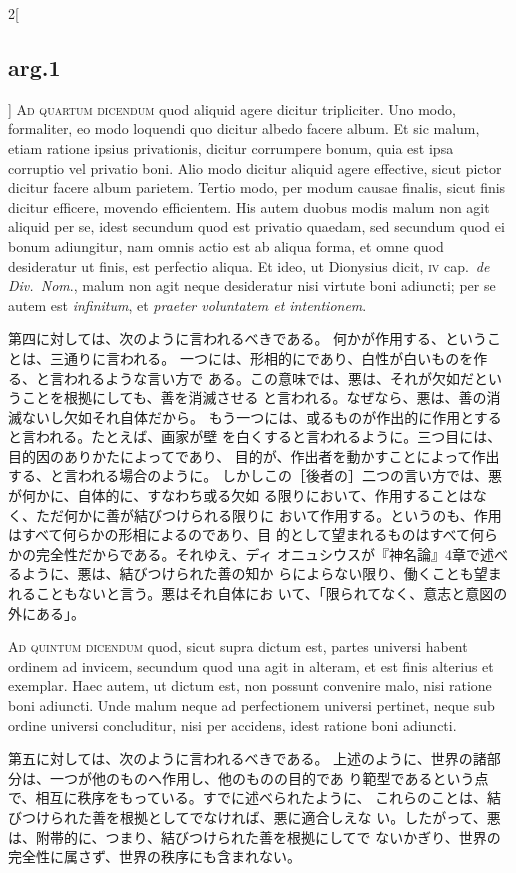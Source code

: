 \documentclass[paper=a4paper,fontsize=10pt,jafontsize=9pt,titlepage]{jlreq}
\begin{document}
\begin{paracol}{2}[\subsection{arg.1}]
{\scshape Ad quartum dicendum} quod aliquid agere dicitur
 tripliciter. Uno modo, formaliter, eo modo loquendi quo dicitur albedo
 facere album. Et sic malum, etiam ratione ipsius privationis, dicitur
 corrumpere bonum, quia est ipsa corruptio vel privatio boni. Alio modo
 dicitur aliquid agere effective, sicut pictor dicitur facere album
 parietem. Tertio modo, per modum causae finalis, sicut finis dicitur
 efficere, movendo efficientem. His autem duobus modis malum non agit
 aliquid per se, idest secundum quod est privatio quaedam, sed secundum
 quod ei bonum adiungitur, nam omnis actio est ab aliqua forma, et omne
 quod desideratur ut finis, est perfectio aliqua. Et ideo, ut Dionysius
 dicit, {\scshape iv} cap.~{\itshape de Div.~Nom}., malum non agit neque
 desideratur nisi virtute boni adiuncti; per se autem est {\itshape
 infinitum}, et {\itshape praeter voluntatem et intentionem}.

\switchcolumn

第四に対しては、次のように言われるべきである。
何かが作用する、ということは、三通りに言われる。
一つには、形相的にであり、白性が白いものを作る、と言われるような言い方で
 ある。この意味では、悪は、それが欠如だということを根拠にしても、善を消滅させる
 と言われる。なぜなら、悪は、善の消滅ないし欠如それ自体だから。
もう一つには、或るものが作出的に作用とすると言われる。たとえば、画家が壁
 を白くすると言われるように。三つ目には、目的因のありかたによってであり、
 目的が、作出者を動かすことによって作出する、と言われる場合のように。
しかしこの［後者の］二つの言い方では、悪が何かに、自体的に、すなわち或る欠如
 る限りにおいて、作用することはなく、ただ何かに善が結びつけられる限りに
 おいて作用する。というのも、作用はすべて何らかの形相によるのであり、目
 的として望まれるものはすべて何らかの完全性だからである。それゆえ、ディ
 オニュシウスが『神名論』4章で述べるように、悪は、結びつけられた善の知か
 らによらない限り、働くことも望まれることもないと言う。悪はそれ自体にお
 いて、「限られてなく、意志と意図の外にある」。

\switchcolumn*[\subsection{ad.5}]

{\scshape Ad quintum dicendum} quod, sicut supra dictum est, partes
 universi habent ordinem ad invicem, secundum quod una agit in alteram,
 et est finis alterius et exemplar. Haec autem, ut dictum est, non
 possunt convenire malo, nisi ratione boni adiuncti. Unde malum neque ad
 perfectionem universi pertinet, neque sub ordine universi concluditur,
 nisi per accidens, idest ratione boni adiuncti.

\switchcolumn

第五に対しては、次のように言われるべきである。
上述のように、世界の諸部分は、一つが他のものへ作用し、他のものの目的であ
 り範型であるという点で、相互に秩序をもっている。すでに述べられたように、
 これらのことは、結びつけられた善を根拠としてでなければ、悪に適合しえな
 い。したがって、悪は、附帯的に、つまり、結びつけられた善を根拠にしてで
 ないかぎり、世界の完全性に属さず、世界の秩序にも含まれない。

\end{paracol}
\newpage
\end{document}
